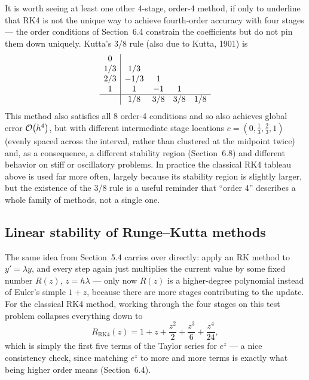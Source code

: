It is worth seeing at least one other 4-stage, order-4 method, if only to underline that RK4 is not the unique way to achieve fourth-order accuracy with four stages --- the order conditions of Section~6.4 constrain the coefficients but do not pin them down uniquely. Kutta's 3/8 rule (also due to Kutta, 1901) is
\begin{equation}
\begin{array}{c|cccc}
0 & & & & \\
1/3 & 1/3 & & & \\
2/3 & -1/3 & 1 & & \\
1 & 1 & -1 & 1 & \\ \hline
 & 1/8 & 3/8 & 3/8 & 1/8
\end{array}
\end{equation}
This method also satisfies all 8 order-4 conditions and so also achieves global error $\mathcal{O}\!\left(h^4\right)$, but with different intermediate stage locations $c=(0,\tfrac13,\tfrac23,1)$ (evenly spaced across the interval, rather than clustered at the midpoint twice) and, as a consequence, a different stability region (Section~6.8) and different behavior on stiff or oscillatory problems. In practice the classical RK4 tableau above is used far more often, largely because its stability region is slightly larger, but the existence of the 3/8 rule is a useful reminder that ``order 4'' describes a whole family of methods, not a single one.

\subsection{Linear stability of Runge--Kutta methods}

The same idea from Section~5.4 carries over directly: apply an RK method to $y'=\lambda y$, and every step again just multiplies the current value by some fixed number $R(z)$, $z=h\lambda$ --- only now $R(z)$ is a higher-degree polynomial instead of Euler's simple $1+z$, because there are more stages contributing to the update. For the classical RK4 method, working through the four stages on this test problem collapses everything down to
\begin{equation}
R_{\mathrm{RK4}}(z) = 1 + z + \frac{z^2}{2} + \frac{z^3}{6} + \frac{z^4}{24},
\end{equation}
which is simply the first five terms of the Taylor series for $e^z$ --- a nice consistency check, since matching $e^z$ to more and more terms is exactly what being higher order means (Section~6.4).

